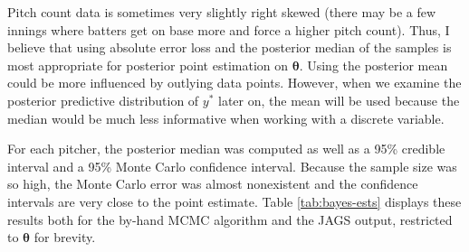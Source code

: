 \documentclass{article}
\begin{document}
Pitch count data is sometimes very slightly right skewed (there may be a few innings where batters get on base more and force a higher pitch count). Thus, I believe that using absolute error loss and the posterior median of the samples is most appropriate for posterior point estimation on $\boldsymbol{\theta}$. Using the posterior mean could be more influenced by outlying data points. However, when we examine the posterior predictive distribution of $y^*$ later on, the mean will be used because the median would be much less informative when working with a discrete variable.

For each pitcher, the posterior median was computed as well as a 95\% credible interval and a 95\% Monte Carlo confidence interval. Because the sample size was so high, the Monte Carlo error was almost nonexistent and the confidence intervals are very close to the point estimate. Table \ref{tab:bayes-ests} displays these results both for the by-hand MCMC algorithm and the JAGS output, restricted to $\boldsymbol{\theta}$ for brevity. 
\end{document}
